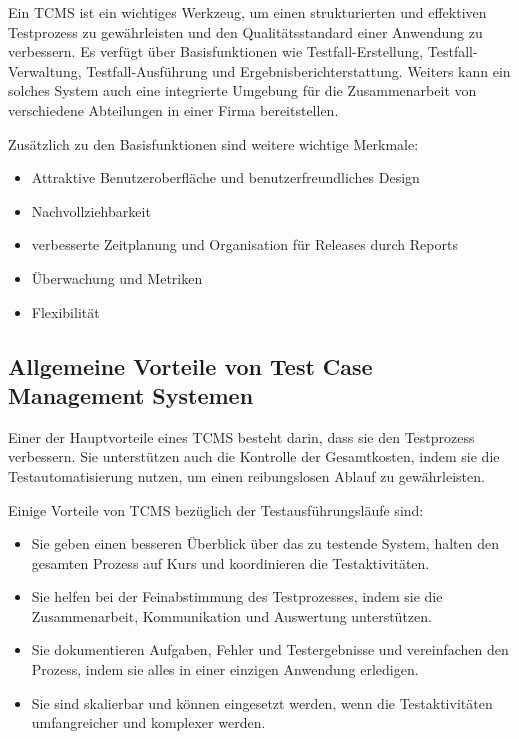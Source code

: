 \documentclass[a4paper, fontsize=11pt, parskip=half, twoside]{scrreprt}
\begin{document}
	Ein \ac{TCMS} ist ein wichtiges Werkzeug, um einen strukturierten und effektiven Testprozess zu gewährleisten und den Qualitätsstandard einer Anwendung zu verbessern.
	Es verfügt über Basisfunktionen wie Testfall-Erstellung, Testfall-Verwaltung, Testfall-Ausführung und Ergebnisberichterstattung. 
	Weiters kann ein solches System auch eine integrierte Umgebung für die Zusammenarbeit von verschiedene Abteilungen in einer Firma bereitstellen.
	
	Zusätzlich zu den Basisfunktionen sind weitere wichtige Merkmale:
	
	\begin{itemize}
		\item Attraktive Benutzeroberfläche und benutzerfreundliches Design
		\item Nachvollziehbarkeit
		\item verbesserte Zeitplanung und Organisation für Releases durch Reports
		\item Überwachung und Metriken
		\item Flexibilität
	\end{itemize}
	
	\textcite{lead_articles_nodate}	
	
	
	\subsection{Allgemeine Vorteile von Test Case Management Systemen}
	Einer der Hauptvorteile eines \ac{TCMS} besteht darin, dass sie den Testprozess verbessern. 
	Sie unterstützen auch die Kontrolle der Gesamtkosten, indem sie die Testautomatisierung nutzen, um einen reibungslosen Ablauf zu gewährleisten.  
	
	Einige Vorteile von \ac{TCMS} bezüglich der Testausführungsläufe sind:
	
	\begin{itemize}
		\item Sie geben einen besseren Überblick über das zu testende System, halten den gesamten Prozess auf Kurs und koordinieren die Testaktivitäten.
		\item Sie helfen bei der Feinabstimmung des Testprozesses, indem sie die Zusammenarbeit, Kommunikation und Auswertung unterstützen.
		\item Sie dokumentieren Aufgaben, Fehler und Testergebnisse und vereinfachen den Prozess, indem sie alles in einer einzigen Anwendung erledigen.
		\item Sie sind skalierbar und können eingesetzt werden, wenn die Testaktivitäten umfangreicher und komplexer werden.
	\end{itemize}
\end{document}
